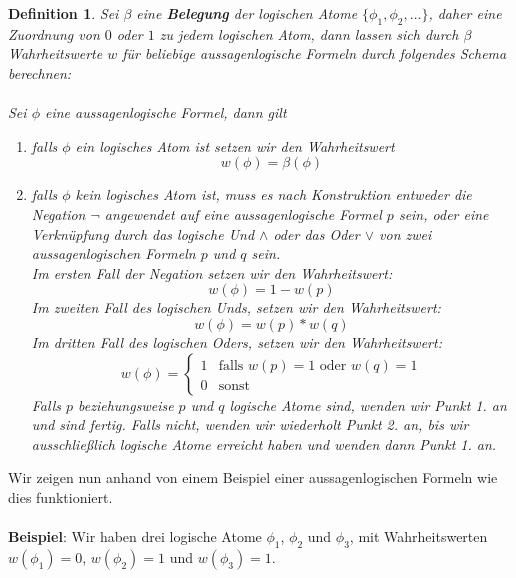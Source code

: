 \documentclass[11pt,a4paper,leqno]{report}
\newtheorem{definition}[theorem]{Definition}
\numberwithin{equation}{chapter}
\begin{document}
\begin{definition}
	Sei $\beta$ eine \textbf{Belegung} der logischen Atome $\{\phi_1, \phi_2, \dots\}$, daher eine Zuordnung von $0$ oder $1$ zu jedem logischen Atom, dann lassen sich durch $\beta$ Wahrheitswerte $w$ f\"ur beliebige aussagenlogische Formeln durch folgendes Schema berechnen:\\
	\\
	Sei $\phi$ eine aussagenlogische Formel, dann gilt
	\begin{enumerate}
		\item falls $\phi$ ein logisches Atom ist setzen wir den Wahrheitswert 
		\begin{equation}
			w(\phi) = \beta(\phi)
		\end{equation}
		\item falls $\phi$ kein logisches Atom ist, muss es nach Konstruktion entweder die Negation $\neg$ angewendet auf eine aussagenlogische Formel $p$ sein, oder eine Verkn\"upfung durch das logische Und $\wedge$ oder das Oder $\vee$ von zwei aussagenlogischen Formeln $p$ und $q$ sein.\\
		Im ersten Fall der Negation setzen wir den Wahrheitswert: 
		\begin{equation}
			w(\phi) = 1 - w(p)
		\end{equation}
		Im zweiten Fall des logischen Unds, setzen wir den Wahrheitswert: 
		\begin{equation}
			w(\phi) = w(p) * w(q)
		\end{equation}
		Im dritten Fall des logischen Oders, setzen wir den Wahrheitswert: 
		\begin{equation}
			w(\phi) = 
			\begin{cases} 
			1 & \text{falls }w(p)=1\text{ oder }w(q)=1\\
			0 & \text{sonst}
			\end{cases}
		\end{equation}
		Falls $p$ beziehungsweise $p$ und $q$ logische Atome sind, wenden wir Punkt 1. an und sind fertig. Falls nicht, wenden wir wiederholt Punkt 2. an, bis wir ausschlie\ss{}lich logische Atome erreicht haben und wenden dann Punkt 1. an.
	\end{enumerate}
\end{definition}
Wir zeigen nun anhand von einem Beispiel einer aussagenlogischen Formeln wie dies funktioniert.\\
\\
\textbf{Beispiel}: Wir haben drei logische Atome $\phi_1$, $\phi_2$ und $\phi_3$, mit Wahrheitswerten $w(\phi_1)=0$, $w(\phi_2)=1$ und $w(\phi_3)=1$.\\
\end{document}
